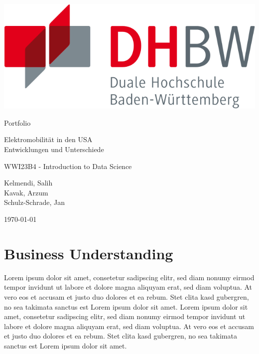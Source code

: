 \documentclass[a4paper,12pt]{scrartcl}
\author{Kavak, Kelmendi, Schulz-Schrade }
\date{\today}
\begin{document}
\thispagestyle{empty}

\begin{center}
\includegraphics[scale=0.3]{img/dhbw.svg.png}

\vspace{3cm}
{\huge Portfolio}

\vspace{2cm}
\begin{Huge}
Elektromobilität in den USA \\
\vspace{0.2cm}
Entwicklungen und Unterschiede
\end{Huge}

\vspace{2cm}
{\large WWI23B4 - Introduction to Data Science}

\vspace{3cm}
\begin{large}
Kelmendi, Salih \\
Kavak, Arzum \\
Schulz-Schrade, Jan \\
\end{large}

\vspace{3cm}
{\Large \today}

\end{center}

\clearpage


\tableofcontents
\thispagestyle{empty}

\newpage
\setcounter{page}{1}



\section{Business Understanding}

Lorem ipsum dolor sit amet, consetetur sadipscing elitr, sed diam nonumy eirmod tempor invidunt ut labore et dolore magna aliquyam erat, sed diam voluptua. At vero eos et accusam et justo duo dolores et ea rebum. Stet clita kasd gubergren, no sea takimata sanctus est Lorem ipsum dolor sit amet. Lorem ipsum dolor sit amet, consetetur sadipscing elitr, sed diam nonumy eirmod tempor invidunt ut labore et dolore magna aliquyam erat, sed diam voluptua. At vero eos et accusam et justo duo dolores et ea rebum. Stet clita kasd gubergren, no sea takimata sanctus est Lorem ipsum dolor sit amet.
\end{document}
